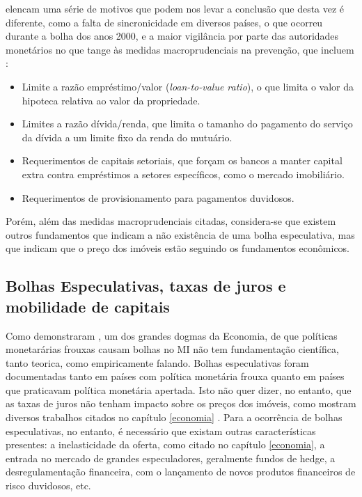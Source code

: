 \documentclass[
	12pt,				%
	oneside,			%
	a4paper,			%
	chapter=TITLE,		%
	section=TITLE,		%
	english,			%
	brazil				%
	]{abntex2}
\begin{document}
\begin{refsection}
\textcite{fmitwa} elencam uma série de motivos que podem nos levar a conclusão que desta
vez é diferente, como a falta de sincronicidade em diversos países, o que
ocorreu durante a bolha dos anos 2000, e a maior vigilância por parte das
autoridades monetários no que tange às medidas macroprudenciais na prevenção,
que incluem \autocite{fmiem}:
\begin{itemize}
\tightlist
\item
  Limite a razão empréstimo/valor (\emph{loan-to-value ratio}), o que limita o valor
  da hipoteca relativa ao valor da propriedade.
\item
  Limites a razão dívida/renda, que limita o tamanho do pagamento do serviço da
  dívida a um limite fixo da renda do mutuário.
\item
  Requerimentos de capitais setoriais, que forçam os bancos a manter capital
  extra contra empréstimos a setores específicos, como o mercado imobiliário.
\item
  Requerimentos de provisionamento para pagamentos duvidosos.
\end{itemize}
Porém, além das medidas macroprudenciais citadas, considera-se que existem
outros fundamentos que indicam a não existência de uma bolha especulativa, mas
que indicam que o preço dos imóveis estão seguindo os fundamentos econômicos.

\hypertarget{bolhas-especulativas-taxas-de-juros-e-mobilidade-de-capitais}{%
\subsection{Bolhas Especulativas, taxas de juros e mobilidade de capitais}\label{bolhas-especulativas-taxas-de-juros-e-mobilidade-de-capitais}}

Como demonstraram \textcite{joebges}, um dos grandes dogmas da Economia, de que políticas
monetarárias frouxas causam bolhas no \gls{MI} não tem fundamentação científica,
tanto teorica, como empiricamente falando. Bolhas especulativas foram
documentadas tanto em países com política monetária frouxa quanto em países que
praticavam política monetária apertada. Isto não quer dizer, no entanto, que as
taxas de juros não tenham impacto sobre os preços dos imóveis, como mostram
diversos trabalhos citados no capítulo \ref{economia} \autocite{macroHousing,goodhart2008,ADAMS2010}. Para a ocorrência de bolhas especulativas, no
entanto, é necessário que existam outras características presentes: a
inelasticidade da oferta, como citado no capítulo \ref{economia}, a entrada no
mercado de grandes especuladores, geralmente fundos de hedge, a
desregulamentação financeira, com o lançamento de novos produtos financeiros de
risco duvidosos, etc.


\end{refsection}
\end{document}
